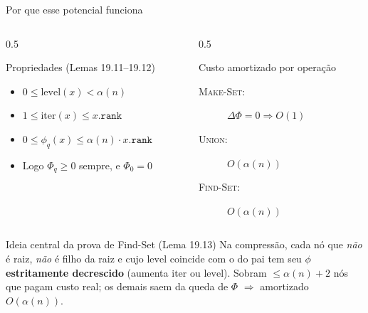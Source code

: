 \documentclass[aspectratio=169]{beamer}
\begin{document}
\begin{frame}[shrink=12]{Por que esse potencial funciona}%
  \begin{columns}[T]
    \begin{column}{0.5\textwidth}
      \begin{block}{Propriedades (Lemas 19.11--19.12)}
        \begin{itemize}
          \item $0 \leq \mathrm{level}(x) < \alpha(n)$
          \item $1 \leq \mathrm{iter}(x) \leq x.\texttt{rank}$
          \item $0 \leq \phi_q(x) \leq \alpha(n)\cdot x.\texttt{rank}$
          \item Logo $\Phi_q \geq 0$ sempre, e $\Phi_0 = 0$
        \end{itemize}
      \end{block}
    \end{column}
    \begin{column}{0.5\textwidth}
      \begin{block}{Custo amortizado por operação}
        \begin{description}
          \item[\textsc{Make-Set}:] $\Delta\Phi = 0 \Rightarrow O(1)$
          \item[\textsc{Union}:] $O(\alpha(n))$
          \item[\textsc{Find-Set}:] $O(\alpha(n))$
        \end{description}
      \end{block}
    \end{column}
  \end{columns}
  \vspace{0.2cm}
  \begin{alertblock}{Ideia central da prova de Find-Set (Lema 19.13)}
    Na compressão, cada nó que \emph{não} é raiz, \emph{não} é filho da raiz e cujo
    $\mathrm{level}$ coincide com o do pai tem seu $\phi$ \textbf{estritamente decrescido}
    (aumenta $\mathrm{iter}$ ou $\mathrm{level}$). Sobram $\leq \alpha(n)+2$ nós que pagam custo
    real; os demais saem da queda de $\Phi$ $\Rightarrow$ amortizado $O(\alpha(n))$.
  \end{alertblock}
\end{frame}
\end{document}
